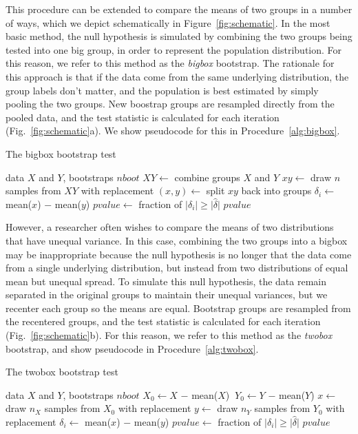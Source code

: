 \documentclass[10pt]{article} %
\begin{document}
This procedure can be extended to compare the means of two groups in a number of ways, which we depict schematically in Figure~\ref{fig:schematic}. In the most basic method, the null hypothesis is simulated by combining the two groups being tested into one big group, in order to represent the population distribution. For this reason, we refer to this method as the \emph{bigbox} bootstrap. The rationale for this approach is that if the data come from the same underlying distribution, the group labels don't matter, and the population is best estimated by simply pooling the two groups. New boostrap groups are resampled directly from the pooled data, and the test statistic is calculated for each iteration (Fig.~\ref{fig:schematic}a). We show pseudocode for this in Procedure~\ref{alg:bigbox}.

\begin{algorithm}
\caption{The bigbox bootstrap test}
\label{alg:bigbox}
\begin{algorithmic} 
\REQUIRE data  $X$ and $Y$, bootstraps $nboot$
\STATE $XY \leftarrow$ combine groups $X$ and $Y$
\STATE $xy \leftarrow$ draw $n$ samples from $XY$ with replacement
 \STATE $(x,y) \leftarrow$ split $xy$ back into groups
 \STATE $\delta_i \leftarrow$ mean($x$) $-$ mean($y$)
 \ENDFOR
 \STATE $pvalue \leftarrow$ fraction of $\lvert \delta_i \rvert \geq \lvert \hat{\delta} \rvert$
 \ENSURE $pvalue$
\end{algorithmic}
\end{algorithm}



However, a researcher often wishes to compare the means of two distributions that have unequal variance. In this case, combining the two groups into a bigbox may be inappropriate because the null hypothesis is no longer that the data come from a single underlying distribution, but instead from two distributions of equal mean but unequal spread. To simulate this null hypothesis, the data remain separated in the original groups to maintain their unequal variances, but we recenter each group so the means are equal. Bootstrap groups are resampled from the recentered groups, and the test statistic is calculated for each iteration (Fig.~\ref{fig:schematic}b). For this reason, we refer to this method as the \emph{twobox} bootstrap, and show pseudocode in Procedure~\ref{alg:twobox}.


\begin{algorithm}
\caption{The twobox bootstrap test}
\label{alg:twobox}
\begin{algorithmic} 
\REQUIRE data $X$ and $Y$, bootstraps $nboot$
\STATE $X_0 \leftarrow X $ $-$ mean($X$) 
\STATE $~Y_0  \leftarrow Y $ $-$ mean($Y$) 
 \STATE $x \leftarrow$ draw $n_X$ samples from $X_0$ with replacement
 \STATE $y \leftarrow$ draw $n_Y$ samples from $Y_0$ with replacement
 \STATE $\delta_i \leftarrow$ mean($x$) $-$ mean($y$)
 \ENDFOR
 \STATE $pvalue \leftarrow$ fraction of $\lvert \delta_i \rvert \geq \lvert \hat{\delta} \rvert$
\ENSURE $pvalue$
\end{algorithmic}
\end{algorithm}
\end{document}
